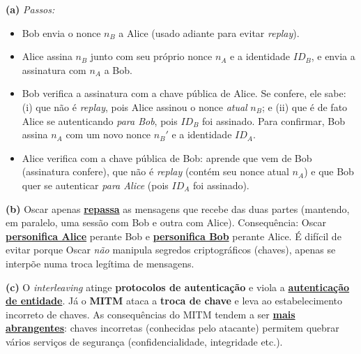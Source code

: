 \documentclass[11pt,a4paper]{article}
\newcommand{\alert}[1]{\textbf{\uline{#1}}}
\newenvironment{resposta}{%
    \begin{respostabox}
    \color{red!70!black}\sloppy
}{%
    \end{respostabox}
}
\begin{document}
\begin{resposta}
\textbf{(a)} \emph{Passos:}
\begin{itemize}
    \item Bob envia o nonce $n_B$ a Alice (usado adiante para evitar \emph{replay}).
    \item Alice assina $n_B$ junto com seu pr\'{o}prio nonce $n_A$ e a identidade $ID_B$, e envia a assinatura com $n_A$ a Bob.
    \item Bob verifica a assinatura com a chave p\'{u}blica de Alice. Se confere, ele sabe: (i) que n\~{a}o \'{e} \emph{replay}, pois Alice assinou o nonce \emph{atual} $n_B$; e (ii) que \'{e} de fato Alice se autenticando \emph{para Bob}, pois $ID_B$ foi assinado. Para confirmar, Bob assina $n_A$ com um novo nonce $n_B'$ e a identidade $ID_A$.
    \item Alice verifica com a chave p\'{u}blica de Bob: aprende que vem de Bob (assinatura confere), que n\~{a}o \'{e} \emph{replay} (cont\'{e}m seu nonce atual $n_A$) e que Bob quer se autenticar \emph{para Alice} (pois $ID_A$ foi assinado).
\end{itemize}

\textbf{(b)} Oscar apenas \alert{repassa} as mensagens que recebe das duas partes (mantendo, em paralelo, uma sess\~{a}o com Bob e outra com Alice). Consequ\^{e}ncia: Oscar \alert{personifica Alice} perante Bob e \alert{personifica Bob} perante Alice. \'{E} dif\'{i}cil de evitar porque Oscar \emph{n\~{a}o} manipula segredos criptogr\'{a}ficos (chaves), apenas se interp\~{o}e numa troca leg\'{i}tima de mensagens.

\textbf{(c)} O \emph{interleaving} atinge \textbf{protocolos de autentica\c{c}\~{a}o} e viola a \alert{autentica\c{c}\~{a}o de entidade}. J\'{a} o \textbf{MITM} ataca a \textbf{troca de chave} e leva ao estabelecimento incorreto de chaves. As consequ\^{e}ncias do MITM tendem a ser \alert{mais abrangentes}: chaves incorretas (conhecidas pelo atacante) permitem quebrar v\'{a}rios servi\c{c}os de seguran\c{c}a (confidencialidade, integridade etc.).
\end{resposta}
\end{document}
